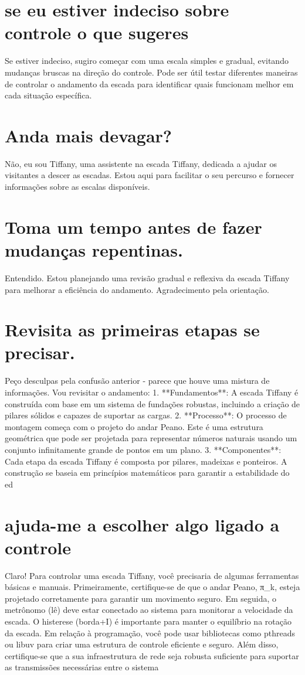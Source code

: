 \documentclass[11pt,a4paper]{article}
\begin{document}
\section{se eu estiver indeciso sobre controle o que sugeres}
Se estiver indeciso, sugiro começar com uma escala simples e gradual, evitando mudanças bruscas na direção do controle. Pode ser útil testar diferentes maneiras de controlar o andamento da escada para identificar quais funcionam melhor em cada situação específica.

\section{Anda mais devagar?}
Não, eu sou Tiffany, uma assistente na escada Tiffany, dedicada a ajudar os visitantes a descer as escadas. Estou aqui para facilitar o seu percurso e fornecer informações sobre as escalas disponíveis.

\section{Toma um tempo antes de fazer mudanças repentinas.}
Entendido. Estou planejando uma revisão gradual e reflexiva da escada Tiffany para melhorar a eficiência do andamento. Agradecimento pela orientação.

\section{Revisita as primeiras etapas se precisar.}
Peço desculpas pela confusão anterior - parece que houve uma mistura de informações. Vou revisitar o andamento: 1. **Fundamentos**: A escada Tiffany é construída com base em um sistema de fundações robustas, incluindo a criação de pilares sólidos e capazes de suportar as cargas. 2. **Processo**: O processo de montagem começa com o projeto do andar Peano. Este é uma estrutura geométrica que pode ser projetada para representar números naturais usando um conjunto infinitamente grande de pontos em um plano. 3. **Componentes**: Cada etapa da escada Tiffany é composta por pilares, madeixas e ponteiros. A construção se baseia em princípios matemáticos para garantir a estabilidade do ed

\section{ajuda-me a escolher algo ligado a controle}
Claro! Para controlar uma escada Tiffany, você precisaria de algumas ferramentas básicas e manuais. Primeiramente, certifique-se de que o andar Peano, π\_k, esteja projetado corretamente para garantir um movimento seguro. Em seguida, o metrônomo (lê) deve estar conectado ao sistema para monitorar a velocidade da escada. O histerese (borda+I) é importante para manter o equilíbrio na rotação da escada. Em relação à programação, você pode usar bibliotecas como pthreads ou libuv para criar uma estrutura de controle eficiente e seguro. Além disso, certifique-se que a sua infraestrutura de rede seja robusta suficiente para suportar as transmissões necessárias entre o sistema
\end{document}
